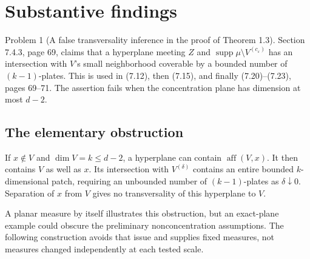 \documentclass[10pt]{article}
\begin{document}
\section*{Substantive findings}
Problem 1 (A false transversality inference in the proof of Theorem 1.3).  Section 7.4.3, page 69, claims that a hyperplane meeting \(Z\) and \(\operatorname{supp}\mu\setminus V^{(c_\varepsilon)}\) has an intersection with \(V\)’s small neighborhood coverable by a bounded number of \((k-1)\)-plates. This is used in (7.12), then (7.15), and finally (7.20)–(7.23), pages 69–71. The assertion fails when the concentration plane has dimension at most \(d-2\).\par
\subsection*{The elementary obstruction}
If \(x\notin V\) and \(\dim V=k\le d-2\), a hyperplane can contain \(\operatorname{aff}(V,x)\). It then contains \(V\) as well as \(x\). Its intersection with \(V^{(\delta)}\) contains an entire bounded \(k\)-dimensional patch, requiring an unbounded number of \((k-1)\)-plates as \(\delta\downarrow0\). Separation of \(x\) from \(V\) gives no transversality of this hyperplane to \(V\).\par
A planar measure by itself illustrates this obstruction, but an exact-plane example could obscure the preliminary nonconcentration assumptions. The following construction avoids that issue and supplies fixed measures, not measures changed independently at each tested scale.\par
\end{document}
